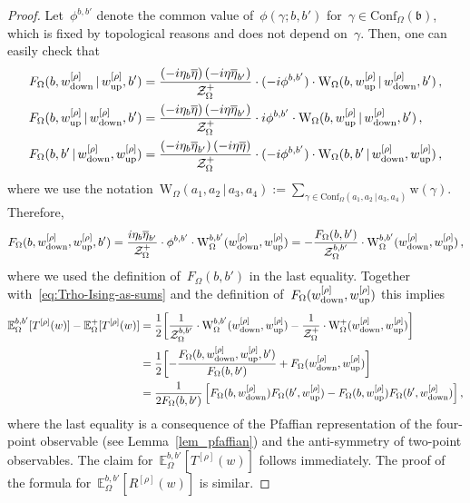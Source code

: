 \documentclass[reqno,11pt,a4paper]{amsart}
\theoremstyle{remark}
\newcommand{\Trho}{T^{[\rho]}}
\newcommand{\Rrho}{R^{[\rho]}}
\renewcommand{\b}{\mathfrak{b}}
\newcommand{\dob}{{b,b'}}
\newcommand{\E}{\mathbb{E}_\Omega}
\newcommand{\weta}{w^{\left[\eta \right]}}
\newcommand{\wrho}{w^{\left[\rho \right]}}
\newcommand{\wup}{\weta_{\vphantom{\mathrm{d}}\mathrm{up}}}
\renewcommand{\wup}{\wrho_{\vphantom{\mathrm{d}}\mathrm{up}}}
\newcommand{\wdown}{\weta_{\mathrm{down}}}
\renewcommand{\wdown}{\wrho_{\mathrm{down}}}
\newcommand{\phase}{\phi}
\newcommand{\weight}{\mathrm{w}}
\newcommand{\F}{F_\Omega}       \newcommand{\Fdelta}{F_{\Omega_\delta}}
\newcommand{\conf}{\mathrm{Conf}}
\newcommand\ConfO[1]{\conf_\Omega(#1)}
\def\cZ{\mathcal Z}
\def\Weight{\mathrm{W}}
\begin{document}
\begin{proof}
Let~$\phase^{b,b'}$ denote the common value of~$\phase(\gamma;b,b')$ for~$\gamma\in\ConfO\b$, which is fixed by topological reasons and does not depend on~$\gamma$. Then, one can easily check that
\begin{align*}
\F(b,\wdown \, | \,  \wup,b') & = \frac{\left(-i\eta_{b}\overline{\eta}\right)\left(-i\eta\overline{\eta}_{b'}\right)}{\cZ_\Omega^{+}}\cdot
(-i\phase^{b,b'}) \cdot \Weight_\Omega(b,\wup\, | \, \wdown,b')\,,\\
\F(b,\wup\, | \, \wdown, b') & = \frac{\left(-i\eta_{b}\overline{\eta}\right)\left(-i\eta\overline{\eta}_{b'}\right)}{\cZ_\Omega^{+}}\cdot
i\phase^{b,b'} \cdot \Weight_\Omega(b,\wup\, | \, \wdown,b')\,,\\
\F(b,b' \, | \,  \wdown, \wup) & = \frac{\left(-i\eta_{b}\overline{\eta}_{b'}\right)\left(-i\eta\overline{\eta}\right)}{\cZ_\Omega^{+}}\cdot
(-i\phase^{b,b'}) \cdot \Weight_\Omega(b,b'\, | \, \wdown,\wup) \,,
\end{align*}
where we use the notation~$ \Weight_\Omega(a_1,a_2\, | \, a_3,a_4) :=
\sum_{\gamma\in \ConfO{a_1,a_2\, | \, a_3,a_4}}{\weight(\gamma)}$. Therefore,
\begin{align*}
\F(b,\wdown, \wup, b') = \frac{i\eta_{b}\overline{\eta}_{b'}}{\cZ_\Omega^{+}} \cdot\phase^{b,b'}\cdot \Weight^{\dob}_\Omega(\wdown,\wup) =
-\frac{\F(b,b')}{\cZ_\Omega^{\dob}}\cdot \Weight^{\dob}_\Omega(\wdown,\wup)\,,
\end{align*}
where we used the definition of~$\F(b,b')$ in the last equality. Together with~\eqref{eq:Trho-Ising-as-sums} and the definition of~$\F(\wdown,\wup)$ this implies
\begin{align*}
\E^{\dob}[\Trho(w)] - \E^+[\Trho(w)] &=
\frac{1}{2}\biggl[ \frac{1}{\cZ_\Omega^{\dob}}\cdot\Weight^{\dob}_\Omega(\wdown,\wup)
-  \frac{1}{\cZ_\Omega^{+}}\cdot\Weight^+_\Omega(\wdown,\wup)  \biggr]\\
&= \frac{1}{2}\biggl[ -\frac{\F(b,\wdown,\wup,b')}{\F(b,b')} + \F(\wdown,\wup)  \biggr] \\
&= \frac{1}{2\F(b,b')}\left[ \F(b,\wdown)\F(b',\wup) - \F(b,\wup)\F(b',\wdown) \right],
\end{align*}
where the last equality is a consequence of the Pfaffian representation of the four-point observable (see Lemma~\ref{lem_pfaffian}) and the anti-symmetry of two-point observables.
The claim for~$\E^{\dob}[\Trho(w)]$ follows immediately. The proof of the formula for~$\E^{\dob}[\Rrho(w)]$ is similar.
\end{proof}
\end{document}
